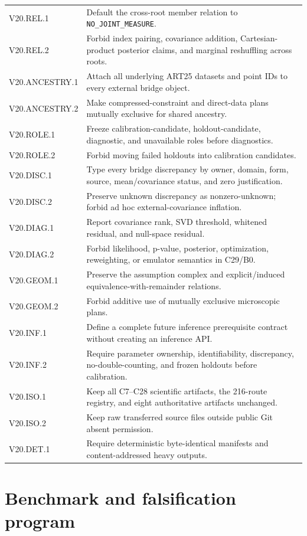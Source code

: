 \documentclass[11pt]{article}
\begin{document}
\begin{longtable}{L{0.19\textwidth}L{0.72\textwidth}}
V20.REL.1 & Default the cross-root member relation to \texttt{NO\_JOINT\_MEASURE}.\\
V20.REL.2 & Forbid index pairing, covariance addition, Cartesian-product posterior claims, and marginal reshuffling across roots.\\
V20.ANCESTRY.1 & Attach all underlying ART25 datasets and point IDs to every external bridge object.\\
V20.ANCESTRY.2 & Make compressed-constraint and direct-data plans mutually exclusive for shared ancestry.\\
V20.ROLE.1 & Freeze calibration-candidate, holdout-candidate, diagnostic, and unavailable roles before diagnostics.\\
V20.ROLE.2 & Forbid moving failed holdouts into calibration candidates.\\
V20.DISC.1 & Type every bridge discrepancy by owner, domain, form, source, mean/covariance status, and zero justification.\\
V20.DISC.2 & Preserve unknown discrepancy as nonzero-unknown; forbid ad hoc external-covariance inflation.\\
V20.DIAG.1 & Report covariance rank, SVD threshold, whitened residual, and null-space residual.\\
V20.DIAG.2 & Forbid likelihood, p-value, posterior, optimization, reweighting, or emulator semantics in C29/B0.\\
V20.GEOM.1 & Preserve the assumption complex and explicit/induced equivalence-with-remainder relations.\\
V20.GEOM.2 & Forbid additive use of mutually exclusive microscopic plans.\\
V20.INF.1 & Define a complete future inference prerequisite contract without creating an inference API.\\
V20.INF.2 & Require parameter ownership, identifiability, discrepancy, no-double-counting, and frozen holdouts before calibration.\\
V20.ISO.1 & Keep all C7--C28 scientific artifacts, the 216-route registry, and eight authoritative artifacts unchanged.\\
V20.ISO.2 & Keep raw transferred source files outside public Git absent permission.\\
V20.DET.1 & Require deterministic byte-identical manifests and content-addressed heavy outputs.\\
\bottomrule
\end{longtable}

\section{Benchmark and falsification program}
\label{sec:benchmarks}
\end{document}
